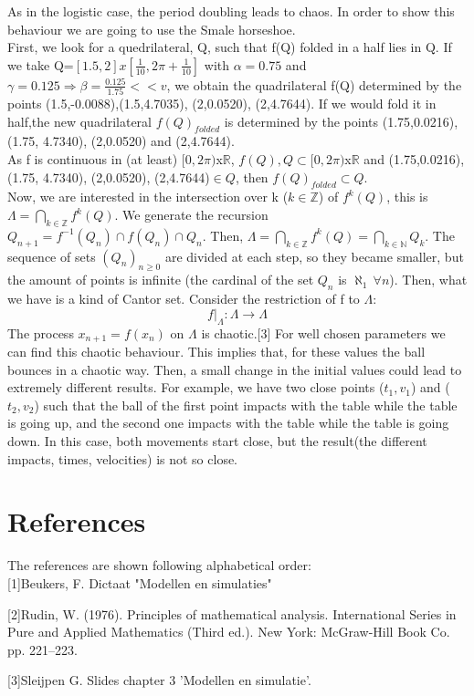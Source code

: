 \documentclass[a4paper]{article}
\begin{document}
As in the logistic case, the period doubling leads to chaos.
In order to show this behaviour we are going to use the Smale horseshoe.\\
First, we look for a quedrilateral, Q, such that f(Q) folded in a half lies in Q.
If we take Q=$[1.5,2]x[\frac{1}{10},2\pi+\frac{1}{10}]$ with $\alpha=0.75$ and $\gamma=0.125 \Rightarrow \beta=\frac{0.125}{1.75}<<v$,
we obtain the quadrilateral f(Q) determined by the points (1.5,-0.0088),(1.5,4.7035), (2,0.0520), (2,4.7644).
If we would fold it in half,the new quadrilateral $f(Q)_{folded}$ is determined by the points (1.75,0.0216), (1.75, 4.7340), (2,0.0520) and (2,4.7644).\\
As f is continuous in (at least) $[0,2\pi)$x$\mathbb{R}$, $f(Q), Q \subset [0,2\pi)$x$\mathbb{R}$ and (1.75,0.0216),\\(1.75, 4.7340), (2,0.0520), (2,4.7644)$\in Q$, then  $f(Q)_{folded}\subset Q$.\\ 
Now, we are interested in the intersection over k ($k\in \mathbb{Z}$) of $f^k(Q)$, this is $\Lambda =\underset{k\in \mathbb{Z}}{\bigcap}f^k(Q)$.
We generate the recursion $Q_{n+1}=f^{-1}(Q_n)\cap f(Q_n) \cap Q_n$.
Then, $\Lambda =\underset{k\in \mathbb{Z}}{\bigcap}f^k(Q)=\underset{k\in \mathbb{N}}{\bigcap}Q_k$.
The sequence of sets $(Q_n)_{n\geq0}$ are divided at each step,
so they became smaller, but the amount of points is infinite (the cardinal of the set $Q_n$ is $\aleph_1 \, \forall n$). Then, what we have is a kind of Cantor set. 
Consider the restriction of f to $\Lambda$:
$$ f|_{\Lambda}:\Lambda \longrightarrow \Lambda$$
The process $x_{n+1}=f(x_n)$ on $\Lambda$ is chaotic.[3]
For well chosen parameters we can find this chaotic behaviour.
This implies that, for these values the ball bounces in a chaotic way. Then, a small change in the initial values could lead to extremely different results.
For example, we have two close points ($t_1,v_1$) and ($t_2,v_2$) such that the ball of the first point impacts with the table while the table is going up,
and the second one impacts with the table while the table is going down.
In this case, both movements start close, but the result(the different impacts, times, velocities) is not so close.





\section{References}

The references are shown following alphabetical order:\\

[1]Beukers, F. Dictaat "Modellen en simulaties"

[2]Rudin, W. (1976). Principles of mathematical analysis. International Series in Pure and Applied Mathematics (Third ed.). New York: McGraw-Hill Book Co. pp. 221–223.

[3]Sleijpen G. Slides chapter 3 'Modellen en simulatie'.
\end{document}
